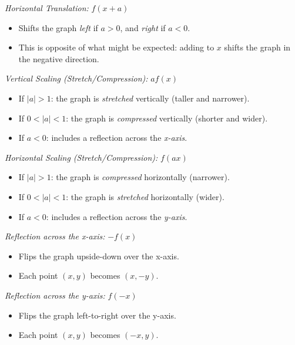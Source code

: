 \emph{Horizontal Translation:} \( f(x + a) \)

\begin{itemize}

	\item Shifts the graph \emph{left} if \( a > 0 \), and \emph{right} if \( a < 0 \).

	\item This is opposite of what might be expected: adding to \(x\) shifts the graph in the negative 
	      direction.

\end{itemize}

\emph{Vertical Scaling (Stretch/Compression):} \( a f(x) \)

\begin{itemize}
	
	\item If \( |a| > 1 \): the graph is \emph{stretched} vertically (taller and narrower).
	
	\item If \( 0 < |a| < 1 \): the graph is \emph{compressed} vertically (shorter and wider).
	
	\item If \( a < 0 \): includes a reflection across the \emph{x-axis}.

\end{itemize}

\emph{Horizontal Scaling (Stretch/Compression):} \( f(a x) \)

\begin{itemize}

	\item If \( |a| > 1 \): the graph is \emph{compressed} horizontally (narrower).

	\item If \( 0 < |a| < 1 \): the graph is \emph{stretched} horizontally (wider).

	\item If \( a < 0 \): includes a reflection across the \emph{y-axis}.

\end{itemize}

\emph{Reflection across the x-axis:} \( -f(x) \)
	
\begin{itemize}

	\item Flips the graph upside-down over the x-axis.

	\item Each point \( (x, y) \) becomes \( (x, -y) \).

\end{itemize}

\emph{Reflection across the y-axis:} \( f(-x) \)

\begin{itemize}

	\item Flips the graph left-to-right over the y-axis.

	\item Each point \( (x, y) \) becomes \( (-x, y) \).

\end{itemize}

